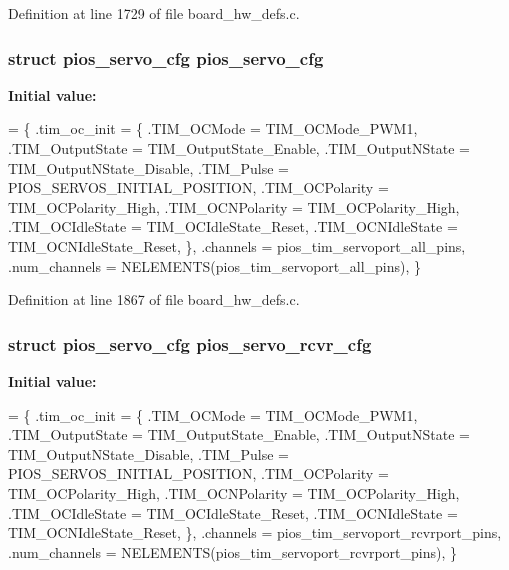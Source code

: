 Definition at line 1729 of file board\-\_\-hw\-\_\-defs.\-c.

\hypertarget{group___tau_labs_core_ga57a87ef16d7949a9cc3589efc8d88a28}{
\subsubsection[{pios\-\_\-servo\-\_\-cfg}]{\setlength{\rightskip}{0pt plus 5cm}struct {\bf pios\-\_\-servo\-\_\-cfg} {\bf pios\-\_\-servo\-\_\-cfg}}}\label{group___tau_labs_core_ga57a87ef16d7949a9cc3589efc8d88a28}
{\bfseries Initial value\-:}
\begin{DoxyCode}
= \{
        .tim\_oc\_init = \{
                .TIM\_OCMode = TIM\_OCMode\_PWM1,
                .TIM\_OutputState = TIM\_OutputState\_Enable,
                .TIM\_OutputNState = TIM\_OutputNState\_Disable,
                .TIM\_Pulse = PIOS\_SERVOS\_INITIAL\_POSITION,
                .TIM\_OCPolarity = TIM\_OCPolarity\_High,
                .TIM\_OCNPolarity = TIM\_OCPolarity\_High,
                .TIM\_OCIdleState = TIM\_OCIdleState\_Reset,
                .TIM\_OCNIdleState = TIM\_OCNIdleState\_Reset,
        \},
        .channels = pios\_tim\_servoport\_all\_pins,
        .num\_channels = NELEMENTS(pios\_tim\_servoport\_all\_pins),
\}
\end{DoxyCode}


Definition at line 1867 of file board\-\_\-hw\-\_\-defs.\-c.

\hypertarget{group___tau_labs_core_gaa111328ef9a12c806ed1c24b93d4f663}{
\subsubsection[{pios\-\_\-servo\-\_\-rcvr\-\_\-cfg}]{\setlength{\rightskip}{0pt plus 5cm}struct {\bf pios\-\_\-servo\-\_\-cfg} pios\-\_\-servo\-\_\-rcvr\-\_\-cfg}}\label{group___tau_labs_core_gaa111328ef9a12c806ed1c24b93d4f663}
{\bfseries Initial value\-:}
\begin{DoxyCode}
= \{
        .tim\_oc\_init = \{
                .TIM\_OCMode = TIM\_OCMode\_PWM1,
                .TIM\_OutputState = TIM\_OutputState\_Enable,
                .TIM\_OutputNState = TIM\_OutputNState\_Disable,
                .TIM\_Pulse = PIOS\_SERVOS\_INITIAL\_POSITION,
                .TIM\_OCPolarity = TIM\_OCPolarity\_High,
                .TIM\_OCNPolarity = TIM\_OCPolarity\_High,
                .TIM\_OCIdleState = TIM\_OCIdleState\_Reset,
                .TIM\_OCNIdleState = TIM\_OCNIdleState\_Reset,
        \},
        .channels = pios\_tim\_servoport\_rcvrport\_pins,
        .num\_channels = NELEMENTS(pios\_tim\_servoport\_rcvrport\_pins),
\}
\end{DoxyCode}


